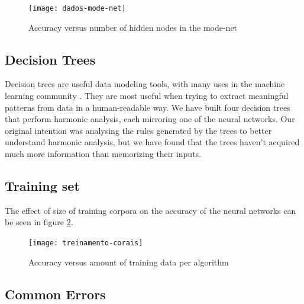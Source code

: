 \documentclass{article}
\begin{document}
\begin{figure}
  \texttt{[image: dados-mode-net]}
  \caption{Accuracy versus number of hidden nodes in the mode-net}
  \label{fig:mode-net}
\end{figure}

\subsection{Decision Trees}

Decision trees are useful data modeling tools, with many uses in the
machine learning community \cite{Mitchell:1997:ML}. They are most
useful when trying to extract meaningful patterns from data in a
human-readable way. We have built four decision trees that perform
harmonic analysis, each mirroring one of the neural networks. Our
original intention was analysing the rules generated by the trees to
better understand harmonic analysis, but we have found that the trees
haven't acquired much more information than memorizing their inputs.

\subsection{Training set}

The effect of size of training corpora on the accuracy of the neural
networks can be seen in figure \ref{fig:treinamento-corais}.

\begin{figure}
  \texttt{[image: treinamento-corais]}
  \caption{Accuracy versus amount of training data per algorithm}
  \label{fig:treinamento-corais}
\end{figure}

\subsection{Common Errors}
\end{document}
